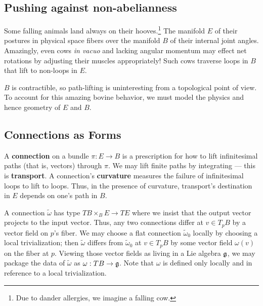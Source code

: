 \documentclass[twocolumn, 11pt]{article}
\newcommand{\gG}{\frak{g}}
\theoremstyle{definition}
\newcommand{\msec}[1]{\subsection*{\color{mblu}\textsf{#1}}}
\begin{document}

    \msec{Pushing against non-abelianness}
        Some falling animals land always on their hooves.\footnote{Due to
        dander allergies, we imagine a falling cow.}  The manifold $E$ of their
        postures in physical space fibers over the manifold $B$ of their
        internal joint angles.  Amazingly, even cows \emph{in vacuo} and
        lacking angular momentum may effect net rotations by adjusting their
        muscles appropriately!  Such cows traverse loops in $B$ that lift to
        non-loops in $E$.

        $B$ is contractible, so path-lifting is uninteresting from a
        topological point of view.  To account for this amazing bovine
        behavior, we must model the physics and hence geometry of $E$ and
        $B$.

    \msec{Connections as Forms}
        A \textbf{connection} on a bundle $\pi:E\to B$ is a prescription for
        how to lift infinitesimal paths (that is, vectors) through $\pi$.  We
        may lift finite paths by integrating --- this is \textbf{transport}.  A
        connection's \textbf{curvature} measures the failure of infinitesimal
        loops to lift to loops.  Thus, in the presence of curvature,
        transport's destination in $E$ depends on one's path in $B$.

        A connection $\tilde\omega$ has type $TB \times_{B} E \to TE$ where we
        insist that the output vector projects to the input vector.
        Thus, any two connections differ at $v \in T_p B$ by a vector field  on
        $p$'s fiber.  We may choose a flat connection $\tilde\omega_0$ locally
        by choosing a local trivialization; then $\tilde\omega$ differs from
        $\tilde\omega_0$ at $v\in T_p B$ by some vector field $\omega(v)$ on
        the fiber at $p$.  Viewing those vector fields as living in a Lie
        algebra $\gG$, we may package the data of $\tilde\omega$ as $\omega:TB
        \to \gG$.  Note that $\omega$ is defined only locally and in reference
        to a local trivialization.
\end{document}
